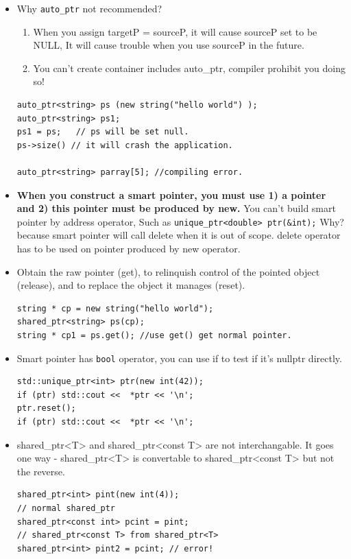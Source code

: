\documentclass[a4paper,11pt,twoside]{book}
\begin{document}
\begin{itemize}
\item Why \texttt{auto\_ptr} not recommended? 
\begin{enumerate}
	\item When you assign targetP = sourceP, it will cause sourceP set to be NULL, It will cause trouble when you use sourceP in the future. 
	\item You can't create container includes auto\_ptr, compiler prohibit you doing so!
\end{enumerate}
\begin{lstlisting}[numbers=none]
auto_ptr<string> ps (new string("hello world") );
auto_ptr<string> ps1;
ps1 = ps;   // ps will be set null.
ps->size() // it will crash the application.

auto_ptr<string> parray[5]; //compiling error.
\end{lstlisting}

\item \textbf{When you construct a smart pointer, you must use 1) a pointer and 2) this pointer must be produced by new.} You can't build smart pointer by address operator, Such as \texttt{unique\_ptr<double> ptr(\&int);}   Why? because smart pointer will call delete when it is out of scope.  delete operator has to be used on pointer produced by new operator.

\item Obtain the raw pointer (get), to relinquish control of the pointed object (release), and to replace the object it manages (reset).
\begin{lstlisting}[numbers=none]
string * cp = new string("hello world");
shared_ptr<string> ps(cp);
string * cp1 = ps.get(); //use get() get normal pointer.
\end{lstlisting}


\item Smart pointer has \texttt{bool} operator, you can use if to test if it's nullptr directly.
\begin{lstlisting}[numbers=none]
std::unique_ptr<int> ptr(new int(42));
if (ptr) std::cout <<  *ptr << '\n';
ptr.reset();
if (ptr) std::cout <<  *ptr << '\n';
\end{lstlisting}

\item shared\_ptr<T> and shared\_ptr<const T> are not interchangable. It goes one way - shared\_ptr<T> is convertable to shared\_ptr<const T> but not the reverse.
\begin{lstlisting}[numbers=none]
shared_ptr<int> pint(new int(4)); 
// normal shared_ptr
shared_ptr<const int> pcint = pint; 
// shared_ptr<const T> from shared_ptr<T>
shared_ptr<int> pint2 = pcint; // error! 
\end{lstlisting}


\end{itemize}
\end{document}
